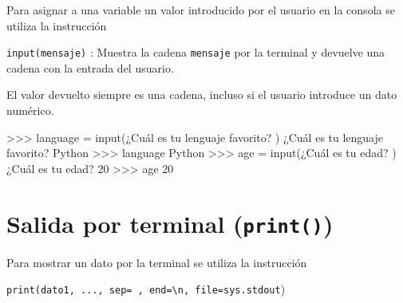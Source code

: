 \documentclass[
  spanish,
  a4paper,
]{scrreport}
\newenvironment{Shaded}{\begin{snugshade}}{\end{snugshade}}
\newcommand{\BuiltInTok}[1]{\textcolor[rgb]{0.00,0.23,0.31}{#1}}
\newcommand{\CommentTok}[1]{\textcolor[rgb]{0.37,0.37,0.37}{#1}}
\newcommand{\DecValTok}[1]{\textcolor[rgb]{0.68,0.00,0.00}{#1}}
\newcommand{\NormalTok}[1]{\textcolor[rgb]{0.00,0.23,0.31}{#1}}
\newcommand{\OperatorTok}[1]{\textcolor[rgb]{0.37,0.37,0.37}{#1}}
\newcommand{\StringTok}[1]{\textcolor[rgb]{0.13,0.47,0.30}{#1}}
\begin{document}
Para asignar a una variable un valor introducido por el usuario en la
consola se utiliza la instrucción

\texttt{input(mensaje)} : Muestra la cadena \texttt{mensaje} por la
terminal y devuelve una cadena con la entrada del usuario.

\begin{tcolorbox}[enhanced jigsaw, arc=.35mm, bottomrule=.15mm, bottomtitle=1mm, breakable, colback=white, colbacktitle=quarto-callout-warning-color!10!white, colframe=quarto-callout-warning-color-frame, coltitle=black, left=2mm, leftrule=.75mm, opacityback=0, opacitybacktitle=0.6, rightrule=.15mm, title=\textcolor{quarto-callout-warning-color}{\faExclamationTriangle}\hspace{0.5em}{Advertencia}, titlerule=0mm, toprule=.15mm, toptitle=1mm]

El valor devuelto siempre es una cadena, incluso si el usuario introduce
un dato numérico.

\end{tcolorbox}

\begin{Shaded}
\begin{Highlighting}[]
\OperatorTok{\textgreater{}\textgreater{}\textgreater{}}\NormalTok{ language }\OperatorTok{=} \BuiltInTok{input}\NormalTok{(}\StringTok{\textquotesingle{}¿Cuál es tu lenguaje favorito? \textquotesingle{}}\NormalTok{)}
\NormalTok{¿Cuál es tu lenguaje favorito? Python}
\OperatorTok{\textgreater{}\textgreater{}\textgreater{}}\NormalTok{ language}
\CommentTok{\textquotesingle{}Python\textquotesingle{}}
\OperatorTok{\textgreater{}\textgreater{}\textgreater{}}\NormalTok{ age }\OperatorTok{=} \BuiltInTok{input}\NormalTok{(}\StringTok{\textquotesingle{}¿Cuál es tu edad? \textquotesingle{}}\NormalTok{)}
\NormalTok{¿Cuál es tu edad? }\DecValTok{20}
\OperatorTok{\textgreater{}\textgreater{}\textgreater{}}\NormalTok{ age}
\CommentTok{\textquotesingle{}20\textquotesingle{}}
\end{Highlighting}
\end{Shaded}

\section{\texorpdfstring{Salida por terminal
(\texttt{print()})}{Salida por terminal (print())}}\label{salida-por-terminal-print}

Para mostrar un dato por la terminal se utiliza la instrucción

\texttt{print(dato1,\ ...,\ sep=\textquotesingle{}\ \textquotesingle{},\ end=\textquotesingle{}\textbackslash{}n\textquotesingle{},\ file=sys.stdout})
\end{document}
